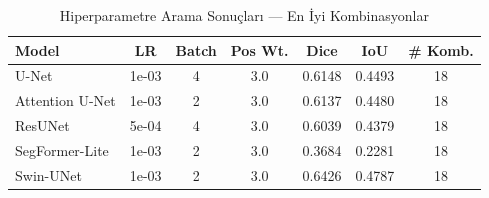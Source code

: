 \begin{table}[htbp]
\centering
\caption{Hiperparametre Arama Sonuçları — En İyi Kombinasyonlar}
\label{tab:hyperparam_summary}
\begin{tabular}{lcccccc}
\hline
\textbf{Model} & \textbf{LR} & \textbf{Batch} & \textbf{Pos Wt.} & \textbf{Dice} & \textbf{IoU} & \textbf{\# Komb.} \\
\hline
U-Net & 1e-03 & 4 & 3.0 & 0.6148 & 0.4493 & 18 \\
Attention U-Net & 1e-03 & 2 & 3.0 & 0.6137 & 0.4480 & 18 \\
ResUNet & 5e-04 & 4 & 3.0 & 0.6039 & 0.4379 & 18 \\
SegFormer-Lite & 1e-03 & 2 & 3.0 & 0.3684 & 0.2281 & 18 \\
Swin-UNet & 1e-03 & 2 & 3.0 & 0.6426 & 0.4787 & 18 \\
\hline
\end{tabular}
\end{table}
